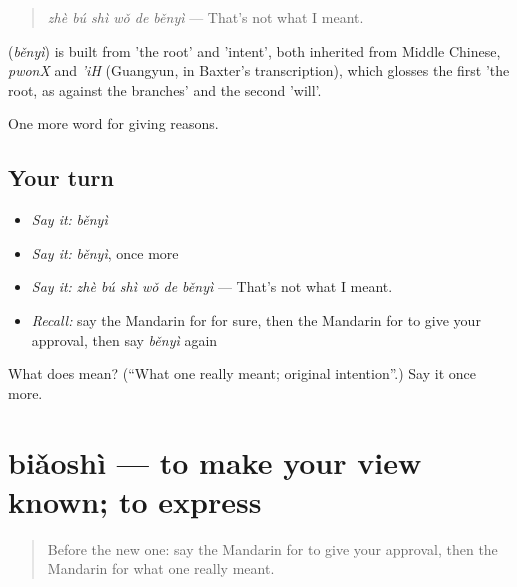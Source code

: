 \begin{quote}
\textbf{} \emph{zhè bú shì wǒ de běnyì} — That's not what I meant.
\end{quote}

\begin{cousinweb}
\textbf{} (\emph{běnyì}) is built from  'the root' and  'intent', both inherited from Middle Chinese, \emph{pwonX} and \emph{'iH} (Guangyun, in Baxter's transcription), which glosses the first 'the root, as against the branches' and the second 'will'.
\end{cousinweb}

\begin{grammarlens}[title={What you've built}]
One more word for giving reasons.
\end{grammarlens}

\subsection*{Your turn}
\begin{itemize}
\raggedright
  \item \emph{Say it:} \emph{běnyì}
  \item \emph{Say it:} \emph{běnyì}, once more
  \item \emph{Say it:} \emph{zhè bú shì wǒ de běnyì} — That's not what I meant.
  \item \emph{Recall:} say the Mandarin for for sure, then the Mandarin for to give your approval, then say \emph{běnyì} again
\end{itemize}

\begin{tcolorbox}[breakable,colback=teal!4,colframe=teal!35!black,title={Before you move on}]
What does  mean? (\textquotedblleft{}What one really meant; original intention\textquotedblright{}.) Say it once more.
\end{tcolorbox}
\section[biǎoshì]{biǎoshì — to make your view known; to express}

\label{lesson:ZH-C352-biaoshi}



\begin{quote}
Before the new one: say the Mandarin for to give your approval, then the Mandarin for what one really meant.
\end{quote}

